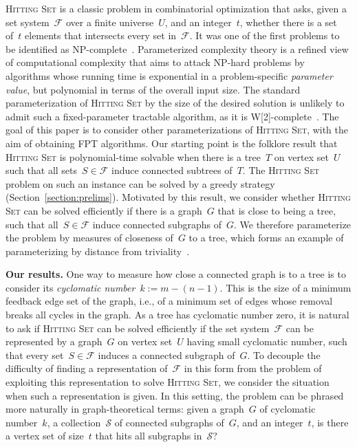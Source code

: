 \let\accentvec\vec  \documentclass{llncs}
\renewcommand{\S}{\ensuremath{\mathcal{S}}\xspace}
\newcommand{\F}{\ensuremath{\mathcal{F}}\xspace}
\newcommand{\HittingSet}{\textsc{Hitting Set}\xspace}
\begin{document}
\HittingSet is a classic problem in combinatorial optimization that asks, given a set system~$\F$ over a finite universe~$U$, and an integer~$t$, whether there is a set of~$t$ elements that intersects every set in~$\F$. It was one of the first problems to be identified as NP-complete~\cite{Karp72}. Parameterized complexity theory is a refined view of computational complexity that aims to attack NP-hard problems by algorithms whose running time is exponential in a problem-specific \emph{parameter value}, but polynomial in terms of the overall input size. The standard parameterization of \HittingSet by the size of the desired solution is unlikely to admit such a fixed-parameter tractable algorithm, as it is W[2]-complete~\cite{DowneyF13}. The goal of this paper is to consider other parameterizations of \HittingSet, with the aim of obtaining FPT algorithms. Our starting point is the folklore result that \HittingSet is polynomial-time solvable when there is a tree~$T$ on vertex set~$U$ such that all sets~$S \in \F$ induce connected subtrees of~$T$. The \HittingSet problem on such an instance can be solved by a greedy strategy (Section~\ref{section:prelims}). Motivated by this result, we consider whether \HittingSet can be solved efficiently if there is a graph~$G$ that is close to being a tree, such that all~$S \in \F$ induce connected subgraphs of~$G$. We therefore parameterize the problem by measures of closeness of~$G$ to a tree, which forms an example of parameterizing by distance from triviality~\cite{Niedermeier10}.

\textbf{Our results.} 
One way to measure how close a connected graph is to a tree is to consider its \emph{cyclomatic number}~$k := m - (n - 1)$. This is the size of a minimum feedback edge set of the graph, i.e., of a minimum set of edges whose removal breaks all cycles in the graph. As a tree has cyclomatic number zero, it is natural to ask if \HittingSet can be solved efficiently if the set system~$\F$ can be represented by a graph~$G$ on vertex set~$U$ having small cyclomatic number, such that every set~$S \in \F$ induces a connected subgraph of~$G$. To decouple the difficulty of finding a representation of~$\F$ in this form from the problem of exploiting this representation to solve \HittingSet, we consider the situation when such a representation is given. In this setting, the problem can be phrased more naturally in graph-theoretical terms: given a graph~$G$ of cyclomatic number~$k$, a collection~$\S$ of connected subgraphs of~$G$, and an integer~$t$, is there a vertex set of size~$t$ that hits all subgraphs in~$\S$? 
\end{document}
